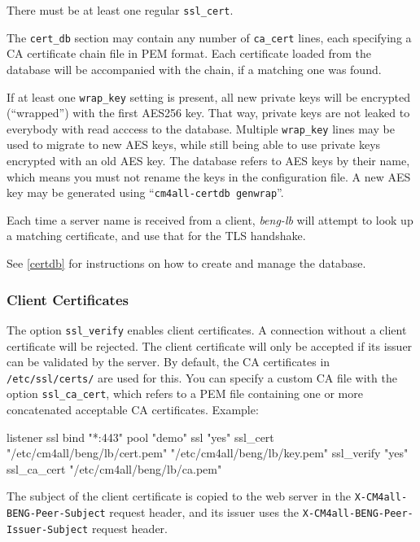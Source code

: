 \documentclass[a4paper,12pt]{article}
\begin{document}
There must be at least one regular \verb|ssl_cert|.

The \verb|cert_db| section may contain any number of \verb|ca_cert|
lines, each specifying a CA certificate chain file in PEM format.
Each certificate loaded from the database will be accompanied with the
chain, if a matching one was found.

If at least one \verb|wrap_key| setting is present, all new private
keys will be encrypted (``wrapped'') with the first AES256 key.  That
way, private keys are not leaked to everybody with read acccess to the
database.  Multiple \verb|wrap_key| lines may be used to migrate to
new AES keys, while still being able to use private keys encrypted
with an old AES key.  The database refers to AES keys by their name,
which means you must not rename the keys in the configuration file.  A
new AES key may be generated using ``\verb|cm4all-certdb genwrap|''.

Each time a server name is received from a client, \emph{beng-lb} will
attempt to look up a matching certificate, and use that for the TLS
handshake.

See \ref{certdb} for instructions on how to create and manage the
database.

\subsubsection{Client Certificates}

The option \verb|ssl_verify| enables client certificates.  A
connection without a client certificate will be rejected.  The client
certificate will only be accepted if its issuer can be validated by
the server.  By default, the CA certificates in \verb|/etc/ssl/certs/|
are used for this.  You can specify a custom CA file with the option
\verb|ssl_ca_cert|, which refers to a PEM file containing one or more
concatenated acceptable CA certificates.  Example:

\begin{verbatim*}
listener ssl {
  bind "*:443"
  pool "demo"
  ssl "yes"
  ssl_cert "/etc/cm4all/beng/lb/cert.pem" "/etc/cm4all/beng/lb/key.pem"
  ssl_verify "yes"
  ssl_ca_cert "/etc/cm4all/beng/lb/ca.pem"
}
\end{verbatim*}

The subject of the client certificate is copied to the web server in
the \verb|X-CM4all-BENG-Peer-Subject| request header, and its issuer
uses the \verb|X-CM4all-BENG-Peer-Issuer-Subject| request header.
\end{document}
